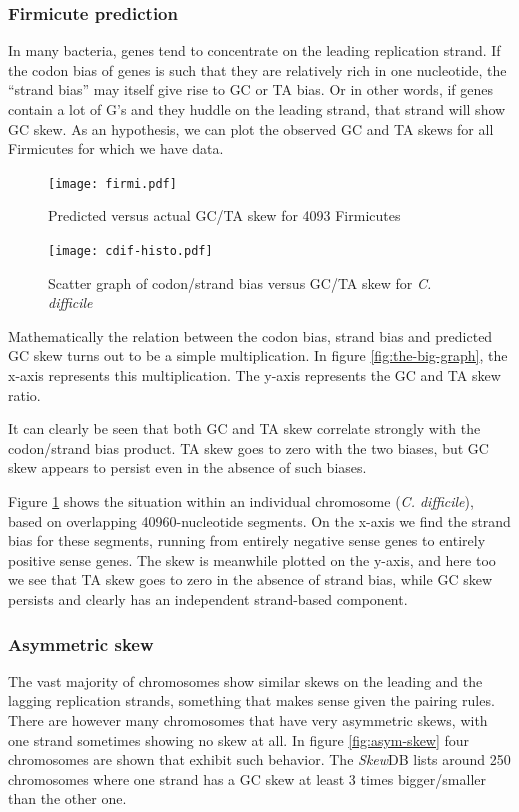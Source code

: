 \documentclass[fleqn,10pt]{wlscirep}
\begin{document}
\subsubsection*{Firmicute prediction}
In many bacteria, genes tend to concentrate on the leading replication strand. If the codon bias of genes is such that they are relatively rich in one nucleotide, the ``strand bias'' may itself give rise to GC or TA bias. Or in other words, if genes contain a lot of G's and they huddle on the leading strand, that strand will show GC skew. As an hypothesis, we can plot the observed GC and TA skews for all Firmicutes for which we have data.


\begin{figure}[ht]
  \centering
    \begin{minipage}[b]{0.45\linewidth}
      \texttt{[image: firmi.pdf]}
      \caption{Predicted versus actual GC/TA skew for 4093 Firmicutes}
      \label{fig:the-big-graph}
    \end{minipage}
    \quad
    \begin{minipage}[b]{0.45\linewidth}
      \texttt{[image: cdif-histo.pdf]}
      \caption{Scatter graph of codon/strand bias versus GC/TA skew for \emph{C. difficile}}
      \label{fig:cdif-scatter}
    \end{minipage}
\end{figure}


Mathematically the relation between the codon bias, strand bias and predicted GC skew turns out to be a simple multiplication. In figure \ref{fig:the-big-graph}, the x-axis represents this multiplication. The y-axis represents the GC and TA skew ratio. 

It can clearly be seen that both GC and TA skew correlate strongly with the codon/strand bias product. TA skew goes to zero with the two biases, but GC skew appears to persist even in the absence of such biases.



Figure \ref{fig:cdif-scatter} shows the situation within an individual chromosome (\emph{C. difficile}), based on overlapping 40960-nucleotide segments. On the x-axis we find the strand bias for these segments, running from entirely negative sense genes to entirely positive sense genes. The skew is meanwhile plotted on the y-axis, and here too we see that TA skew goes to zero in the absence of strand bias, while GC skew persists and clearly has an independent strand-based component.

\subsubsection*{Asymmetric skew}
The vast majority of chromosomes show similar skews on the leading and the lagging replication strands, something that makes sense given the pairing rules. There are however many chromosomes that have very asymmetric skews, with one strand sometimes showing no skew at all. In figure \ref{fig:asym-skew} four chromosomes are shown that exhibit such behavior. The \emph{Skew}DB lists around 250 chromosomes where one strand has a GC skew at least 3 times bigger/smaller than the other one.
\end{document}
